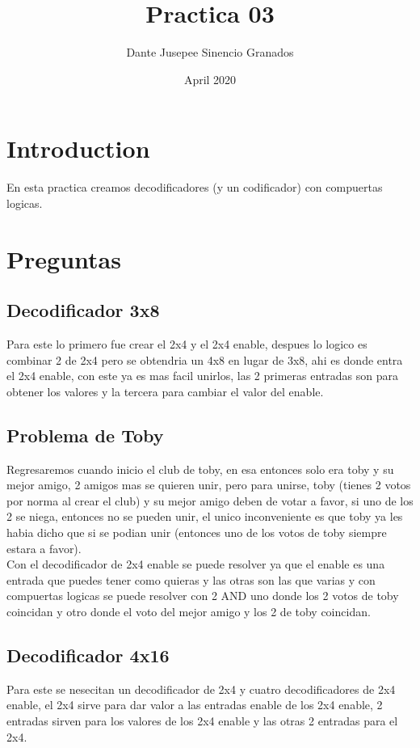 \documentclass{article}
\title{Practica 03}
\author{Dante Jusepee Sinencio Granados}
\affil{Facultad de ciencias, UNAM}
\date{April 2020}
\begin{document}
\maketitle

\section{Introduction}
En esta practica creamos decodificadores (y un codificador) con compuertas logicas.

\section{Preguntas}
\subsection{Decodificador 3x8}
Para este lo primero fue crear el 2x4 y el 2x4 enable, despues lo logico es combinar 2 de 2x4 pero se obtendria un 4x8 en lugar de 3x8, ahi es donde entra el 2x4 enable, con este ya es mas facil unirlos, las 2 primeras entradas son para obtener los valores y la tercera para cambiar el valor del enable.

\subsection{Problema de Toby}
Regresaremos cuando inicio el club de toby, en esa entonces solo era toby y su mejor amigo, 2 amigos mas se quieren unir, pero para unirse, toby (tienes 2 votos por norma al crear el club) y su mejor amigo deben de votar a favor, si uno de los 2 se niega, entonces no se pueden unir, el unico inconveniente es que toby ya les habia dicho que si se podian unir (entonces uno de los votos de toby siempre estara a favor).
\\
Con el decodificador de 2x4 enable se puede resolver ya que el enable es una entrada que puedes tener como quieras y las otras son las que varias y con compuertas logicas se puede resolver con 2 AND uno donde los 2 votos de toby coincidan y otro donde el voto del mejor amigo y los 2 de toby coincidan.

\subsection{Decodificador 4x16}
Para este se nesecitan un decodificador de 2x4 y cuatro decodificadores de 2x4 enable, el 2x4 sirve para dar valor a las entradas enable de los 2x4 enable, 2 entradas sirven para los valores de los 2x4 enable y las otras 2 entradas para el 2x4.
\end{document}
